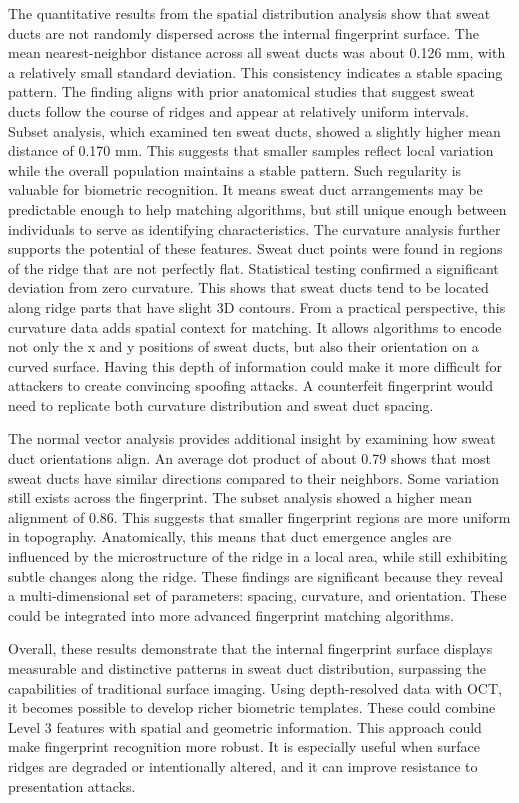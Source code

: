 The quantitative results from the spatial distribution analysis show that sweat ducts are not randomly dispersed across the internal fingerprint surface. The mean nearest-neighbor distance across all sweat ducts was about 0.126 mm, with a relatively small standard deviation. This consistency indicates a stable spacing pattern. The finding aligns with prior anatomical studies that suggest sweat ducts follow the course of ridges and appear at relatively uniform intervals. Subset analysis, which examined ten sweat ducts, showed a slightly higher mean distance of 0.170 mm. This suggests that smaller samples reflect local variation while the overall population maintains a stable pattern. Such regularity is valuable for biometric recognition. It means sweat duct arrangements may be predictable enough to help matching algorithms, but still unique enough between individuals to serve as identifying characteristics. The curvature analysis further supports the potential of these features. Sweat duct points were found in regions of the ridge that are not perfectly flat. Statistical testing confirmed a significant deviation from zero curvature. This shows that sweat ducts tend to be located along ridge parts that have slight 3D contours. From a practical perspective, this curvature data adds spatial context for matching. It allows algorithms to encode not only the x and y positions of sweat ducts, but also their orientation on a curved surface. Having this depth of information could make it more difficult for attackers to create convincing spoofing attacks. A counterfeit fingerprint would need to replicate both curvature distribution and sweat duct spacing.

The normal vector analysis provides additional insight by examining how sweat duct orientations align. An average dot product of about 0.79 shows that most sweat ducts have similar directions compared to their neighbors. Some variation still exists across the fingerprint. The subset analysis showed a higher mean alignment of 0.86. This suggests that smaller fingerprint regions are more uniform in topography. Anatomically, this means that duct emergence angles are influenced by the microstructure of the ridge in a local area, while still exhibiting subtle changes along the ridge. These findings are significant because they reveal a multi-dimensional set of parameters: spacing, curvature, and orientation. These could be integrated into more advanced fingerprint matching algorithms. 

Overall, these results demonstrate that the internal fingerprint surface displays measurable and distinctive patterns in sweat duct distribution, surpassing the capabilities of traditional surface imaging. Using depth-resolved data with OCT, it becomes possible to develop richer biometric templates. These could combine Level 3 features with spatial and geometric information. This approach could make fingerprint recognition more robust. It is especially useful when surface ridges are degraded or intentionally altered, and it can improve resistance to presentation attacks.
